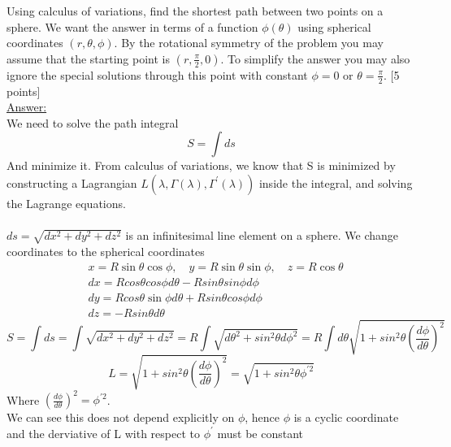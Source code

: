 \documentclass[11pt,a4paper]{report}
\newcounter{excount}[chapter]
\newenvironment{exercise}[1][]{\addtocounter{excount}{1} \noindent {\bf Question
    \arabic{excount} \ \ #1}\hspace{2mm}}{\vspace{4mm}}
\begin{document}
\begin{exercise}{\bf Finding the shortest way\\}
Using calculus of variations, find the shortest path between two points on a sphere. We want the answer in terms of a function $\phi(\theta)$ using spherical coordinates $(r,\theta,\phi)$. By the rotational symmetry of the problem you may assume that the starting point is $(r,\frac{\pi}{2},0)$. To simplify the answer you may also ignore the special solutions through this point with constant $\phi=0$ or $\theta=\frac{\pi}{2}$.   [5 points]\\



\underline{Answer:}\\
We need to solve the path integral
\begin{equation}
S = \int ds
\end{equation}
And minimize it. From calculus of variations, we know that S is minimized by constructing a Lagrangian $L(\lambda, \Gamma (\lambda), \Gamma^{\prime} (\lambda))$ inside the integral, and solving the Lagrange equations.\\
\\
$ds = \sqrt{dx^{2} + dy^{2} + dz^{2}}$ is an infinitesimal line element on a sphere.
We change coordinates to the spherical coordinates
\begin{align*}
&x = R\sin \theta \cos\phi, \quad y = R\sin \theta \sin \phi, \quad z = R\cos \theta\\
&dx = Rcos\theta cos\phi d\theta - Rsin\theta sin\phi d\phi\\
&dy = Rcos\theta \sin \phi d\theta + Rsin \theta cos\phi d\phi\\
&dz = -Rsin\theta d\theta
\end{align*}
\begin{equation}
S = \int ds = \int \sqrt{dx^{2} + dy^{2} + dz^{2}} = R\int \sqrt{d\theta^{2} + sin^{2}\theta d\phi^{2} } = R\int d\theta \sqrt{1 + sin^{2}\theta (\frac{d\phi}{d\theta})^{2}}
\end{equation}
\begin{equation}
L = \sqrt{1 + sin^{2}\theta (\frac{d\phi}{d\theta})^{2}} = \sqrt{1 + sin^{2}\theta \phi^{\prime 2}}
\end{equation}
Where $(\frac{d\phi}{d\theta})^{2} = \phi^{\prime 2}$.\\
We can see this does not depend explicitly on $\phi$, hence $\phi$ is a cyclic coordinate and the derviative of L with respect to $\phi^{\prime}$ must be constant

\end{exercise}
\end{document}
